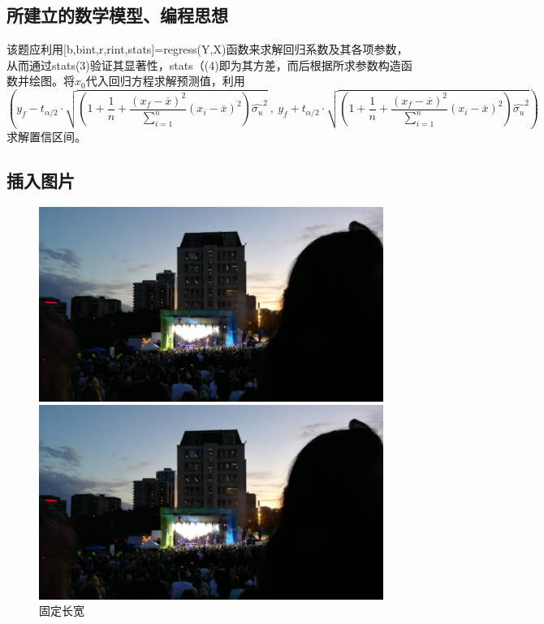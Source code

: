 \documentclass[UTF8,12pt,a4paper]{article}
\begin{document}
\subsection{所建立的数学模型、编程思想}
该题应利用[b,bint,r,rint,stats]=regress(Y,X)函数来求解回归系数及其各项参数，从而通过stats(3)验证其显著性，stats（(4)即为其方差，而后根据所求参数构造函数并绘图。将$x_0$代入回归方程求解预测值，利用
\begin{equation*}
\scriptstyle\left(y_f-t_{\alpha/2}\cdot\sqrt{\left(1+\dfrac{1}{n}+\dfrac{{\left(x_f-\overline{x}\right)}^2}{\sum_{i=1}^{n}}{{(x_i-\overline{x})}^2}\right)\hat{\sigma_u}^2}\ ,\ y_f+t_{\alpha/2}\cdot\sqrt{\left(1+\dfrac{1}{n}+\dfrac{{\left(x_f-\overline{x}\right)}^2}{\sum_{i=1}^{n}}{{(x_i-\overline{x})}^2}\right)\hat{\sigma_u}^2}\right)
\end{equation*}
求解置信区间。

\subsection{插入图片}

\begin{figure}[!h]
	\centering
	\begin{minipage}[c]{0.45\textwidth}
		\centering
		\includegraphics[width=\linewidth, height=0.4\textheight]{city}
	\end{minipage}
	\quad
	\begin{minipage}[c]{0.45\textwidth}
		\centering
		\includegraphics[width=\linewidth, height=0.4\textheight]{city}
	\end{minipage}
	\caption{固定长宽}
\end{figure}
\end{document}
